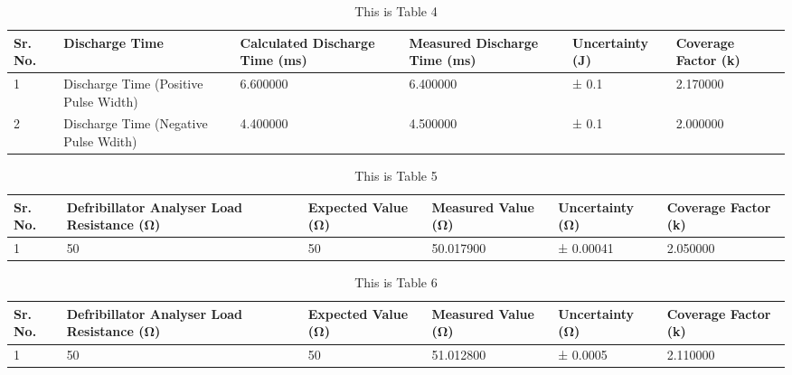 \begin{table}
\caption{This is Table 4}
\begin{tabular}{|p{2.33 cm}|p{2.33 cm}|p{2.33 cm}|p{2.33 cm}|p{2.33 cm}|p{2.33 cm}|}
\toprule
Sr. No. & Discharge Time & Calculated Discharge Time (ms) & Measured Discharge Time (ms) & Uncertainty (J) & Coverage Factor (k) \\ \hline
\midrule
1 & Discharge Time (Positive Pulse Width) & 6.600000 & 6.400000 & ± 0.1 & 2.170000 \\ \hline
2 & Discharge Time (Negative Pulse Wdith) & 4.400000 & 4.500000 & ± 0.1 & 2.000000 \\ \hline
\bottomrule
\end{tabular}
\end{table}
\begin{table}
\caption{This is Table 5}
\begin{tabular}{|p{2.33 cm}|p{2.33 cm}|p{2.33 cm}|p{2.33 cm}|p{2.33 cm}|p{2.33 cm}|}
\toprule
Sr. No. & Defribillator Analyser Load Resistance (Ω) & Expected Value (Ω) & Measured Value (Ω) & Uncertainty (Ω) & Coverage Factor (k) \\ \hline
\midrule
1 & 50 & 50 & 50.017900 &  ± 0.00041 & 2.050000 \\ \hline
\bottomrule
\end{tabular}
\end{table}
\begin{table}
\caption{This is Table 6}
\begin{tabular}{|p{2.33 cm}|p{2.33 cm}|p{2.33 cm}|p{2.33 cm}|p{2.33 cm}|p{2.33 cm}|}
\toprule
Sr. No. & Defribillator Analyser Load Resistance (Ω) & Expected Value (Ω) & Measured Value (Ω) & Uncertainty (Ω) & Coverage Factor (k) \\ \hline
\midrule
1 & 50 & 50 & 51.012800 &  ± 0.0005 & 2.110000 \\ \hline
\bottomrule
\end{tabular}
\end{table}
